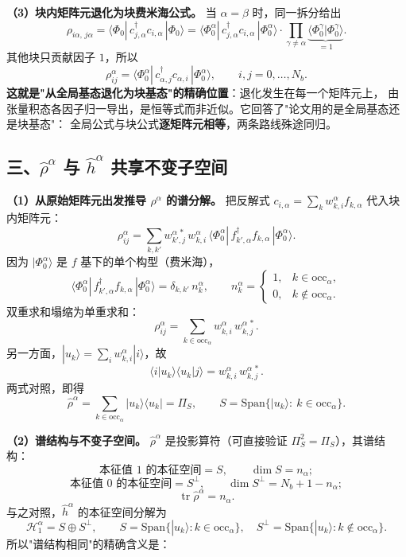 \documentclass[11pt]{ctexart}
\begin{document}
\textbf{（3）块内矩阵元退化为块费米海公式。}
当 $\alpha=\beta$ 时，同一拆分给出
\[
\rho_{i\alpha,\,j\alpha}
=
\langle\Phi_0|\,c_{j,\alpha}^{\dagger}c_{i,\alpha}\,|\Phi_0\rangle
=
\langle\Phi_0^{\alpha}|\,c_{j,\alpha}^{\dagger}c_{i,\alpha}\,|\Phi_0^{\alpha}\rangle
\cdot
\prod_{\gamma\neq\alpha}\underbrace{\big\langle\Phi_0^{\gamma}\big|\Phi_0^{\gamma}\big\rangle}_{=1} .
\]
其他块只贡献因子 $1$，所以
\[
\rho_{ij}^{\alpha}
=
\langle\Phi_0^{\alpha}|\,c_{\alpha,j}^{\dagger}c_{\alpha,i}\,|\Phi_0^{\alpha}\rangle ,
\qquad i,j=0,\dots,N_b .
\]
\textbf{这就是"从全局基态退化为块基态"的精确位置}：退化发生在每一个矩阵元上，
由张量积态各因子归一导出，是恒等式而非近似。它回答了"论文用的是全局基态还是块基态"：
全局公式与块公式\textbf{逐矩阵元相等}，两条路线殊途同归。

\subsection{三、$\hat\rho^\alpha$ 与 $\hat h^\alpha$ 共享不变子空间}

\textbf{（1）从原始矩阵元出发推导 $\rho^\alpha$ 的谱分解。}
把反解式 $c_{i,\alpha}=\sum_k w_{k,i}^{\alpha}f_{k,\alpha}$ 代入块内矩阵元：
\[
\rho_{ij}^{\alpha}
=
\sum_{k,k'}w_{k',j}^{\alpha\,*}\,w_{k,i}^{\alpha}\,
\langle\Phi_0^{\alpha}|\,f_{k',\alpha}^{\dagger}f_{k,\alpha}\,|\Phi_0^{\alpha}\rangle .
\]
因为 $|\Phi_0^{\alpha}\rangle$ 是 $f$ 基下的单个构型（费米海），
\[
\langle\Phi_0^{\alpha}|\,f_{k',\alpha}^{\dagger}f_{k,\alpha}\,|\Phi_0^{\alpha}\rangle
=
\delta_{k,k'}\,n_k^{\alpha},
\qquad
n_k^{\alpha}=
\begin{cases}
1, & k\in\mathrm{occ}_\alpha,\\
0, & k\notin\mathrm{occ}_\alpha .
\end{cases}
\]
双重求和塌缩为单重求和：
\[
\rho_{ij}^{\alpha}
=
\sum_{k\in\mathrm{occ}_\alpha}w_{k,i}^{\alpha}\,w_{k,j}^{\alpha\,*} .
\]
另一方面，$|u_k\rangle=\sum_i w_{k,i}^{\alpha}|i\rangle$，故
\[
\langle i|u_k\rangle\langle u_k|j\rangle
=
w_{k,i}^{\alpha}\,w_{k,j}^{\alpha\,*} .
\]
两式对照，即得
\[
\hat\rho^\alpha
=
\sum_{k\in\mathrm{occ}_\alpha}|u_k\rangle\langle u_k|
=
\Pi_S ,
\qquad
S=\mathrm{Span}\{|u_k\rangle:\ k\in\mathrm{occ}_\alpha\} .
\]

\textbf{（2）谱结构与不变子空间。}
$\hat\rho^\alpha$ 是投影算符（可直接验证 $\Pi_S^2=\Pi_S$），其谱结构：
\[
\text{本征值 }1 \text{ 的本征空间}=S,\qquad \dim S=n_\alpha ;
\]
\[
\text{本征值 }0 \text{ 的本征空间}=S^{\perp},\qquad
\dim S^{\perp}=N_b+1-n_\alpha ;
\]
\[
\operatorname{tr}\hat\rho^\alpha=n_\alpha .
\]
与之对照，$\hat h^\alpha$ 的本征空间分解为
\[
\mathcal{H}_1^\alpha=S\oplus S^{\perp},
\qquad
S=\mathrm{Span}\{|u_k\rangle:k\in\mathrm{occ}_\alpha\},
\quad
S^{\perp}=\mathrm{Span}\{|u_k\rangle:k\notin\mathrm{occ}_\alpha\} .
\]
所以"谱结构相同"的精确含义是：
\end{document}
